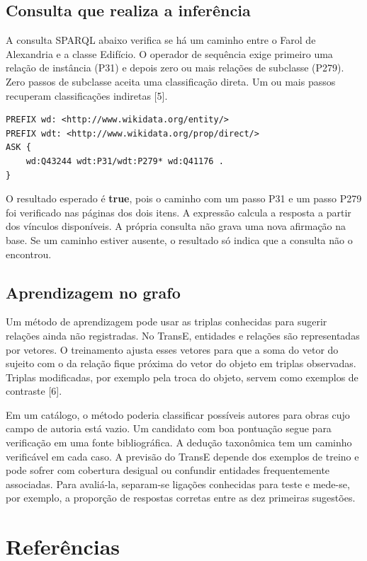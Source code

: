 \documentclass[12pt,a4paper]{article}
\begin{document}
\subsection{Consulta que realiza a inferência}

A consulta SPARQL abaixo verifica se há um caminho entre o Farol de Alexandria e a classe Edifício. O operador de sequência exige primeiro uma relação de instância (P31) e depois zero ou mais relações de subclasse (P279). Zero passos de subclasse aceita uma classificação direta. Um ou mais passos recuperam classificações indiretas [5].

\begin{lstlisting}
PREFIX wd: <http://www.wikidata.org/entity/>
PREFIX wdt: <http://www.wikidata.org/prop/direct/>
ASK {
    wd:Q43244 wdt:P31/wdt:P279* wd:Q41176 .
}
\end{lstlisting}

O resultado esperado é \textbf{true}, pois o caminho com um passo P31 e um passo P279 foi verificado nas páginas dos dois itens. A expressão calcula a resposta a partir dos vínculos disponíveis. A própria consulta não grava uma nova afirmação na base. Se um caminho estiver ausente, o resultado só indica que a consulta não o encontrou.

\subsection{Aprendizagem no grafo}

Um método de aprendizagem pode usar as triplas conhecidas para sugerir relações ainda não registradas. No TransE, entidades e relações são representadas por vetores. O treinamento ajusta esses vetores para que a soma do vetor do sujeito com o da relação fique próxima do vetor do objeto em triplas observadas. Triplas modificadas, por exemplo pela troca do objeto, servem como exemplos de contraste [6].

Em um catálogo, o método poderia classificar possíveis autores para obras cujo campo de autoria está vazio. Um candidato com boa pontuação segue para verificação em uma fonte bibliográfica. A dedução taxonômica tem um caminho verificável em cada caso. A previsão do TransE depende dos exemplos de treino e pode sofrer com cobertura desigual ou confundir entidades frequentemente associadas. Para avaliá-la, separam-se ligações conhecidas para teste e mede-se, por exemplo, a proporção de respostas corretas entre as dez primeiras sugestões.

\section*{Referências}
\end{document}
